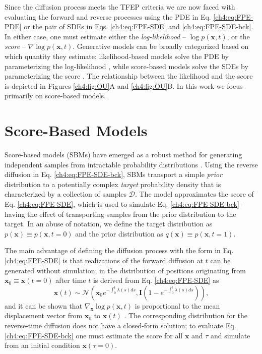 Since the diffusion process meets the TFEP criteria we are now faced with evaluating the forward and reverse processes using the PDE in Eq. \ref{ch4:eq:FPE-PDE} or the pair of SDEs in Eqs. \ref{ch4:eq:FPE-SDE} and \ref{ch4:eq:FPE-SDE-bck}. In either case, one must estimate either the {\it log-likelihood} -- $\log p(\mathbf{x}, t)$, or the {\it score} --  $\nabla \log p(\mathbf{x}, t)$. Generative models can be broadly categorized based on which quantity they estimate: likelihood-based models solve the PDE by parameterizing the log-likelihood \cite{NeuralODE, Noe2019Boltzmann, NFReview}, while score-based models solve the SDEs by parameterizing the score \cite{Song2021ScoreBased, Ho2020DDPM}. The relationship between the likelihood and the score is depicted in Figures \ref{ch4:fig:OU}A and \ref{ch4:fig:OU}B. In this work we focus primarily on score-based models.

\section{Score-Based Models}

Score-based models (SBMs) have emerged as a robust method for generating independent samples from intractable probability distributions \cite{Song2021ScoreBased}. Using the reverse diffusion in Eq. \ref{ch4:eq:FPE-SDE-bck}, SBMs transport a simple {\it prior} distribution to a potentially complex {\it target} probability density that is characterized by a collection of samples $\mathcal{D}$. The model approximates the score of Eq. \ref{ch4:eq:FPE-SDE}, which is used to simulate Eq. \ref{ch4:eq:FPE-SDE-bck} -- having the effect of transporting samples from the prior distribution to the target. In an abuse of notation, we define the target distribution as $p(\mathbf{x}) \equiv p(\mathbf{x},t=0)$ and the prior distribution as $q(\mathbf{x}) \equiv p(\mathbf{x},t=1)$.

The main advantage of defining the diffusion process with the form in Eq. \ref{ch4:eq:FPE-SDE} is that realizations of the forward diffusion at $t$ can be generated without simulation; in \cite{Song2021ScoreBased} the distribution of positions originating from $\mathbf{x}_0 \equiv \mathbf{x}(t=0)$ after time $t$ is derived from Eq. \ref{ch4:eq:FPE-SDE} as
\begin{equation}
\mathbf{x}(t) \sim \mathcal{N}\left( \mathbf{x}_0 e^{-\int_0^t \lambda(s)ds },  \mathbf{I}(1 - e^{-\int_0^t \lambda(s)ds}) \right),
\label{ch4:eq:path-distribution}
\end{equation}
and it can be shown that $\nabla_{\mathbf{x}} \log p(\mathbf{x}, t)$ is proportional to the mean displacement vector from $\mathbf{x}_0$ to $\mathbf{x}(t)$ \cite{luo-unified-perspectives}. The corresponding distribution for the reverse-time diffusion does not have a closed-form solution; to evaluate Eq. \ref{ch4:eq:FPE-SDE-bck} one must estimate the score for all $\mathbf{x}$ and $\tau$ and simulate from an initial condition $\mathbf{x}(\tau=0)$.


